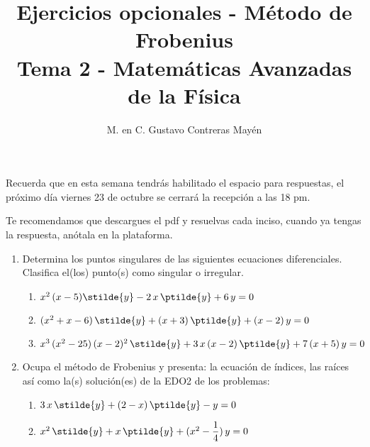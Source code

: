 
\usepackage{apacite}
\title{Ejercicios opcionales - Método de Frobenius\\[0.3em]  \large{Tema 2 - Matemáticas Avanzadas de la Física}\vspace{-3ex}}
\author{M. en C. Gustavo Contreras Mayén}
\date{ }

\vspace{-4cm}
\maketitle
\fontsize{14}{14}\selectfont
Recuerda que en esta semana tendrás habilitado el espacio para respuestas, el próximo día viernes 23 de octubre se cerrará la recepción a las 18 pm.
\par
Te recomendamos que descargues el pdf y resuelvas cada inciso, cuando ya tengas la respuesta, anótala en la plataforma.
\begin{enumerate}
\item Determina los puntos singulares de las siguientes ecuaciones diferenciales. Clasifica el(los) punto(s) como singular o irregular.
\begin{enumerate}
\item $x^{2} \, (x - 5) \stilde{y} - 2 \, x \, \ptilde{y} + 6 \, y = 0$
\item $(x^{2} + x - 6) \, \stilde{y} + (x + 3)  \, \ptilde{y} + (x - 2) \, y = 0$
\item $x^{3} \, (x^{2} - 25) \, (x - 2)^{2} \, \stilde{y} + 3 \, x \, (x - 2) \, \ptilde{y} + 7 \, (x + 5) \, y = 0$
\end{enumerate}
\item Ocupa el método de Frobenius y presenta: la ecuación de índices, las raíces así como la(s) solución(es) de la EDO2 de los problemas:
\begin{enumerate}
\item $3 \, x \, \stilde{y} + (2 - x) \, \ptilde{y} - y = 0$
\item $x^{2} \, \stilde{y} + x \, \ptilde{y} + (x^{2} - \dfrac{1}{4}) \, y = 0$
\end{enumerate}
\end{enumerate}
